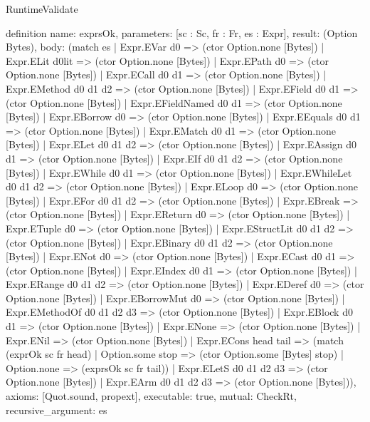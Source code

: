 \begin{lexlean}{RuntimeValidate}
\begin{semanticmodule}
definition{
  name: exprsOk,
  parameters: [sc : Sc, fr : Fr, es : Expr],
  result: (Option Bytes),
  body: (match es
    | Expr.EVar d0 => (ctor Option.none [Bytes])
    | Expr.ELit d0lit => (ctor Option.none [Bytes])
    | Expr.EPath d0 => (ctor Option.none [Bytes])
    | Expr.ECall d0 d1 => (ctor Option.none [Bytes])
    | Expr.EMethod d0 d1 d2 => (ctor Option.none [Bytes])
    | Expr.EField d0 d1 => (ctor Option.none [Bytes])
    | Expr.EFieldNamed d0 d1 => (ctor Option.none [Bytes])
    | Expr.EBorrow d0 => (ctor Option.none [Bytes])
    | Expr.EEquals d0 d1 => (ctor Option.none [Bytes])
    | Expr.EMatch d0 d1 => (ctor Option.none [Bytes])
    | Expr.ELet d0 d1 d2 => (ctor Option.none [Bytes])
    | Expr.EAssign d0 d1 => (ctor Option.none [Bytes])
    | Expr.EIf d0 d1 d2 => (ctor Option.none [Bytes])
    | Expr.EWhile d0 d1 => (ctor Option.none [Bytes])
    | Expr.EWhileLet d0 d1 d2 => (ctor Option.none [Bytes])
    | Expr.ELoop d0 => (ctor Option.none [Bytes])
    | Expr.EFor d0 d1 d2 => (ctor Option.none [Bytes])
    | Expr.EBreak => (ctor Option.none [Bytes])
    | Expr.EReturn d0 => (ctor Option.none [Bytes])
    | Expr.ETuple d0 => (ctor Option.none [Bytes])
    | Expr.EStructLit d0 d1 d2 => (ctor Option.none [Bytes])
    | Expr.EBinary d0 d1 d2 => (ctor Option.none [Bytes])
    | Expr.ENot d0 => (ctor Option.none [Bytes])
    | Expr.ECast d0 d1 => (ctor Option.none [Bytes])
    | Expr.EIndex d0 d1 => (ctor Option.none [Bytes])
    | Expr.ERange d0 d1 d2 => (ctor Option.none [Bytes])
    | Expr.EDeref d0 => (ctor Option.none [Bytes])
    | Expr.EBorrowMut d0 => (ctor Option.none [Bytes])
    | Expr.EMethodOf d0 d1 d2 d3 => (ctor Option.none [Bytes])
    | Expr.EBlock d0 d1 => (ctor Option.none [Bytes])
    | Expr.ENone => (ctor Option.none [Bytes])
    | Expr.ENil => (ctor Option.none [Bytes])
    | Expr.ECons head tail => (match (exprOk sc fr head)
      | Option.some stop => (ctor Option.some [Bytes] stop)
      | Option.none => (exprsOk sc fr tail))
    | Expr.ELetS d0 d1 d2 d3 => (ctor Option.none [Bytes])
    | Expr.EArm d0 d1 d2 d3 => (ctor Option.none [Bytes])),
  axioms: [Quot.sound, propext],
  executable: true,
  mutual: CheckRt,
  recursive_argument: es
}


\end{semanticmodule}
\end{lexlean}
